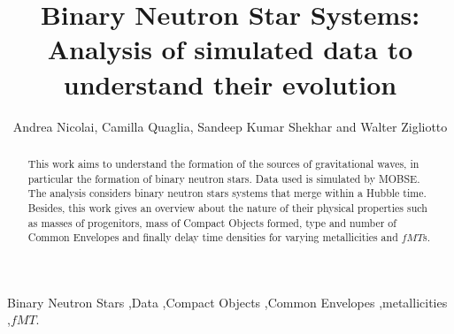 \documentclass[preprint,12pt]{elsarticle}
\begin{document}
\begin{frontmatter}


\title{Binary Neutron Star Systems: Analysis of simulated data to understand their evolution}




\author{Andrea Nicolai, Camilla Quaglia, Sandeep Kumar Shekhar and Walter Zigliotto}

\address{Department of Physics and Astronomy \\ Università degli Studi di Padova \\via 8 Febbraio 1848, 2, 35122 Padova PD}

\begin{abstract}
This work aims to understand the formation of the sources of gravitational waves, in particular the formation of binary neutron stars. Data used is simulated by MOBSE. The analysis considers binary neutron stars systems that merge within a Hubble time. Besides, this work gives an overview about the nature of their physical properties such as masses of progenitors, mass of Compact Objects formed, type and number of Common Envelopes and finally delay time densities for varying metallicities and $fMT$s.  
\end{abstract}

\begin{keyword}
Binary Neutron Stars \sep Data \sep Compact Objects \sep Common Envelopes \sep metallicities \sep $fMT$.


\end{keyword}

\end{frontmatter}
\end{document}
